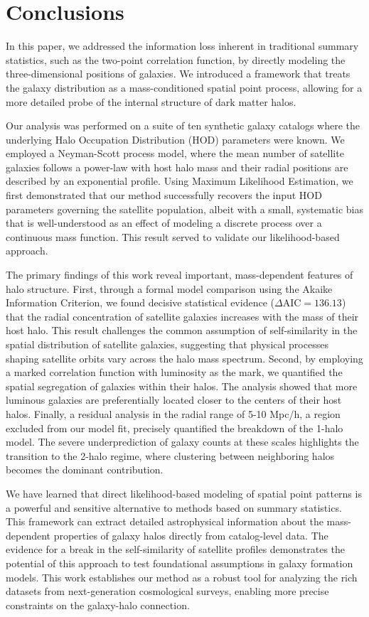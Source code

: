 \documentclass[]{article}
\begin{document}
\section{Conclusions}
\label{sec:conclusions}
In this paper, we addressed the information loss inherent in traditional summary statistics, such as the two-point correlation function, by directly modeling the three-dimensional positions of galaxies. We introduced a framework that treats the galaxy distribution as a mass-conditioned spatial point process, allowing for a more detailed probe of the internal structure of dark matter halos.

Our analysis was performed on a suite of ten synthetic galaxy catalogs where the underlying Halo Occupation Distribution (HOD) parameters were known. We employed a Neyman-Scott process model, where the mean number of satellite galaxies follows a power-law with host halo mass and their radial positions are described by an exponential profile. Using Maximum Likelihood Estimation, we first demonstrated that our method successfully recovers the input HOD parameters governing the satellite population, albeit with a small, systematic bias that is well-understood as an effect of modeling a discrete process over a continuous mass function. This result served to validate our likelihood-based approach.

The primary findings of this work reveal important, mass-dependent features of halo structure. First, through a formal model comparison using the Akaike Information Criterion, we found decisive statistical evidence ($\Delta \text{AIC} = 136.13$) that the radial concentration of satellite galaxies increases with the mass of their host halo. This result challenges the common assumption of self-similarity in the spatial distribution of satellite galaxies, suggesting that physical processes shaping satellite orbits vary across the halo mass spectrum. Second, by employing a marked correlation function with luminosity as the mark, we quantified the spatial segregation of galaxies within their halos. The analysis showed that more luminous galaxies are preferentially located closer to the centers of their host halos. Finally, a residual analysis in the radial range of 5-10 Mpc/h, a region excluded from our model fit, precisely quantified the breakdown of the 1-halo model. The severe underprediction of galaxy counts at these scales highlights the transition to the 2-halo regime, where clustering between neighboring halos becomes the dominant contribution.

We have learned that direct likelihood-based modeling of spatial point patterns is a powerful and sensitive alternative to methods based on summary statistics. This framework can extract detailed astrophysical information about the mass-dependent properties of galaxy halos directly from catalog-level data. The evidence for a break in the self-similarity of satellite profiles demonstrates the potential of this approach to test foundational assumptions in galaxy formation models. This work establishes our method as a robust tool for analyzing the rich datasets from next-generation cosmological surveys, enabling more precise constraints on the galaxy-halo connection.


{}

\end{document}
